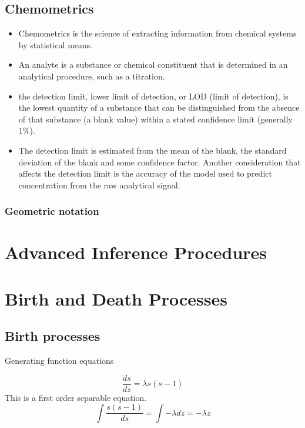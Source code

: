 \section{Chemometrics}
\begin{itemize}
	\item  Chemometrics is the science of extracting information from chemical systems by statistical means.
	\item An analyte is a substance or chemical constituent that is determined in an analytical procedure, such as a titration.
	\item the detection limit, lower limit of detection, or LOD (limit of detection), is the lowest quantity of a substance that can be distinguished from the absence of that substance (a blank value) within a stated confidence limit (generally 1\%).
	\item The detection limit is estimated from the mean of the blank, the standard deviation of the blank and some confidence factor. Another consideration that affects the detection limit is the accuracy of the model used to predict concentration from the raw analytical signal.
	
\end{itemize}

\subsection{Geometric notation}


\chapter{Advanced Inference Procedures}




\chapter{Birth and Death Processes}


\section{Birth processes}
Generating function equations

\[
\frac{ds}{dz} = \lambda s(s-1)
\]
This is a first order separable equation.
\[
\int \frac{s(s-1)}{ds} = \int -\lambda dz = -\lambda z
\]


